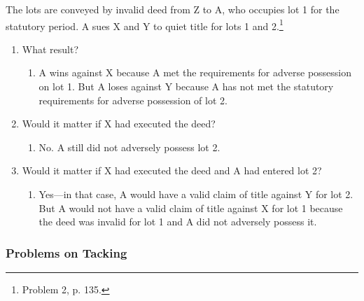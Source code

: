 \begin{enumerate}
    The lots are conveyed by invalid deed from Z to A, who occupies lot 1 for 
    the statutory period. A sues X and Y to quiet title for lots 1 and 
    2.\footnote{Problem 2, p. 135.}
    \begin{enumerate}
        \item What result?
        \begin{enumerate}
            \item A wins against X because A met the requirements 
            for adverse possession on lot 1. But A loses against Y because A 
            has not met the statutory requirements for adverse possession of 
            lot 2.
        \end{enumerate}
        \item Would it matter if X had executed the deed?
        \begin{enumerate}
            \item No. A still did not adversely possess lot 2.
        \end{enumerate}
        \item Would it matter if X had executed the deed and A had entered lot 
        2?
        \begin{enumerate}
            \item Yes---in that case, A would have a valid claim of title 
            against Y for lot 2. But A would not have a valid claim of title 
            against X for lot 1 because the deed was invalid for lot 1 and A 
            did not adversely possess it.
        \end{enumerate}
    \end{enumerate}
\end{enumerate}

\subsubsection{Problems on Tacking}

